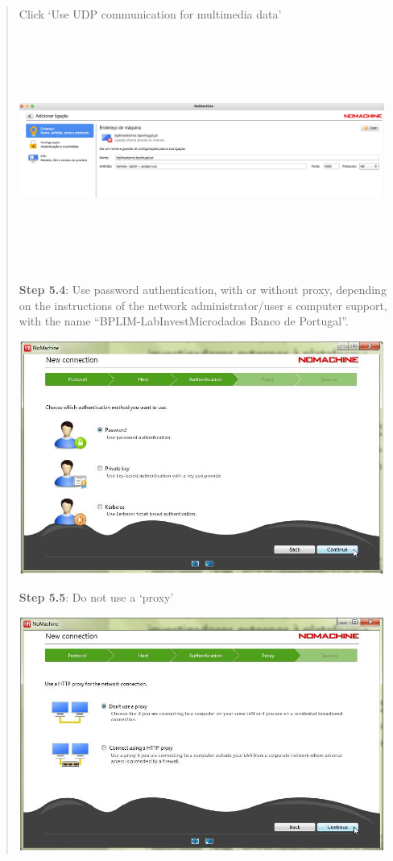 \documentclass[
  11pt,
  a4paper,
]{article}
\begin{document}
\begin{quote}
Click `Use UDP communication for multimedia data'

\includegraphics[width=4.72441in,height=3.02002in]{./media/image28_new.png}

\textbf{Step 5.4}: Use password authentication, with or without proxy,
depending on the instructions of the network administrator/user
\textquotesingle s computer support, with the name
``BPLIM-LabInvestMicrodados Banco de Portugal''.

\includegraphics[width=4.72441in,height=3.02438in]{./media/image29.png}

\textbf{Step 5.5}: Do not use a `proxy'

\includegraphics[width=4.72441in,height=3.03165in]{./media/image30.png}


\end{quote}
\end{document}
